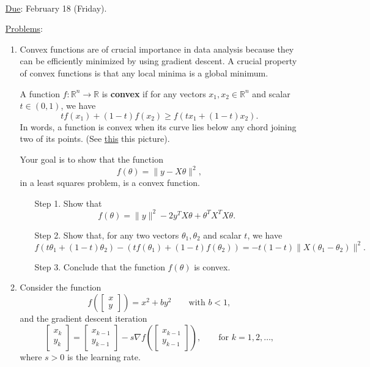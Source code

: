 \documentclass{article}
\begin{document}
\\


\bigskip

\begin{itemize}
\item[\underline{Due}:] February 18 (Friday).
\item[\underline{Problems}:]
\begin{enumerate}
\item
Convex functions are of crucial importance in data analysis because they can be efficiently minimized by using gradient descent. 
A crucial property of convex functions is that any local minima is a global minimum.


\bigskip

A function $f:\mathbb{R}^n \rightarrow \mathbb{R}$ is \textbf{convex} if for any vectors $x_1,x_2\in\mathbb{R}^n$ and scalar $t\in (0,1)$, we have
\[
t f(x_1) + (1-t)f(x_2) \geq f(tx_1+(1-t)x_2).
\]
In words, a function is convex when its curve lies below any chord joining two of its points.
(See \href{https://en.wikipedia.org/wiki/Convex_function#/media/File:ConvexFunction.svg}{this} this picture).

\bigskip

Your goal is to show that the function
\[
f(\theta) = \| y- X\theta\|^2,
\]
in a least squares problem, is a convex function.

\medskip

\begin{enumerate}
\item[Step 1.] Show that
\[
f(\theta) = \|y\|^2 - 2y^TX\theta + \theta^TX^TX\theta.
\]
\item[Step 2.] Show that, for any two vectors $\theta_1,\theta_2$ and scalar $t$, we have
\[
f(t\theta_1 + (1-t)\theta_2) - 
\left( t f(\theta_1)+(1-t)f(\theta_2)\right) =
 -t(1-t)\|X(\theta_1-\theta_2)\|^2.
\]
\item[Step 3.] Conclude that the function $f(\theta)$ is convex.
\end{enumerate}

\bigskip

\item Consider the function
\[
f\left(\begin{bmatrix}x\\y\end{bmatrix} \right) = x^2 + by^2 \qquad \mbox{with }b<1,
\]
and the gradient descent iteration
\[
\begin{bmatrix}x_k\\y_k\end{bmatrix}  = 
\begin{bmatrix}x_{k-1}\\y_{k-1}\end{bmatrix} -
s \nabla f\left(\begin{bmatrix}x_{k-1}\\y_{k-1}\end{bmatrix} \right), \qquad \mbox{for }k=1,2,\hdots,
\]
where $s>0$ is the learning rate.


\end{enumerate}
\end{itemize}
\end{document}
